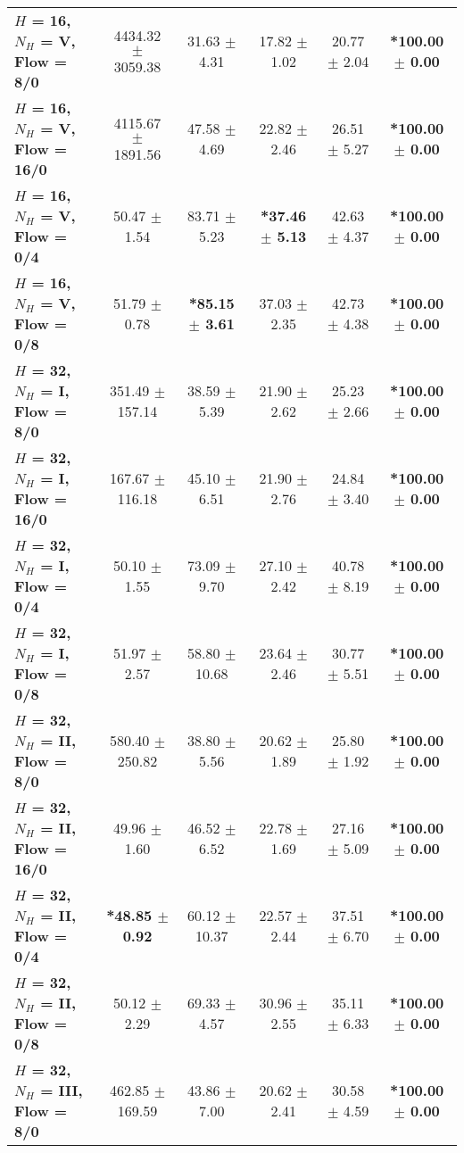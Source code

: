 \begin{table*}[ht]
{\begin{tabular}{lccccc}
        \midrule
        \textbf{$H$ = 16, $N_H$ = V, Flow = 8/0} & 4434.32 $\pm$ 3059.38 & 31.63 $\pm$ 4.31 & 17.82 $\pm$ 1.02 & 20.77 $\pm$ 2.04 & \textbf{*100.00 $\pm$ 0.00} \\
        \textbf{$H$ = 16, $N_H$ = V, Flow = 16/0} & 4115.67 $\pm$ 1891.56 & 47.58 $\pm$ 4.69 & 22.82 $\pm$ 2.46 & 26.51 $\pm$ 5.27 & \textbf{*100.00 $\pm$ 0.00} \\
        \textbf{$H$ = 16, $N_H$ = V, Flow = 0/4} & 50.47 $\pm$ 1.54 & 83.71 $\pm$ 5.23 & \textbf{*37.46 $\pm$ 5.13} & 42.63 $\pm$ 4.37 & \textbf{*100.00 $\pm$ 0.00} \\
        \textbf{$H$ = 16, $N_H$ = V, Flow = 0/8} & 51.79 $\pm$ 0.78 & \textbf{*85.15 $\pm$ 3.61} & 37.03 $\pm$ 2.35 & 42.73 $\pm$ 4.38 & \textbf{*100.00 $\pm$ 0.00} \\
        \midrule
        \midrule
        \textbf{$H$ = 32, $N_H$ = I, Flow = 8/0} & 351.49 $\pm$ 157.14 & 38.59 $\pm$ 5.39 & 21.90 $\pm$ 2.62 & 25.23 $\pm$ 2.66 & \textbf{*100.00 $\pm$ 0.00} \\
        \textbf{$H$ = 32, $N_H$ = I, Flow = 16/0} & 167.67 $\pm$ 116.18 & 45.10 $\pm$ 6.51 & 21.90 $\pm$ 2.76 & 24.84 $\pm$ 3.40 & \textbf{*100.00 $\pm$ 0.00} \\
        \textbf{$H$ = 32, $N_H$ = I, Flow = 0/4} & 50.10 $\pm$ 1.55 & 73.09 $\pm$ 9.70 & 27.10 $\pm$ 2.42 & 40.78 $\pm$ 8.19 & \textbf{*100.00 $\pm$ 0.00} \\
        \textbf{$H$ = 32, $N_H$ = I, Flow = 0/8} & 51.97 $\pm$ 2.57 & 58.80 $\pm$ 10.68 & 23.64 $\pm$ 2.46 & 30.77 $\pm$ 5.51 & \textbf{*100.00 $\pm$ 0.00} \\
        \midrule
        \textbf{$H$ = 32, $N_H$ = II, Flow = 8/0} & 580.40 $\pm$ 250.82 & 38.80 $\pm$ 5.56 & 20.62 $\pm$ 1.89 & 25.80 $\pm$ 1.92 & \textbf{*100.00 $\pm$ 0.00} \\
        \textbf{$H$ = 32, $N_H$ = II, Flow = 16/0} & 49.96 $\pm$ 1.60 & 46.52 $\pm$ 6.52 & 22.78 $\pm$ 1.69 & 27.16 $\pm$ 5.09 & \textbf{*100.00 $\pm$ 0.00} \\
        \textbf{$H$ = 32, $N_H$ = II, Flow = 0/4} & \textbf{*48.85 $\pm$ 0.92} & 60.12 $\pm$ 10.37 & 22.57 $\pm$ 2.44 & 37.51 $\pm$ 6.70 & \textbf{*100.00 $\pm$ 0.00} \\
        \textbf{$H$ = 32, $N_H$ = II, Flow = 0/8} & 50.12 $\pm$ 2.29 & 69.33 $\pm$ 4.57 & 30.96 $\pm$ 2.55 & 35.11 $\pm$ 6.33 & \textbf{*100.00 $\pm$ 0.00} \\
        \midrule
        \textbf{$H$ = 32, $N_H$ = III, Flow = 8/0} & 462.85 $\pm$ 169.59 & 43.86 $\pm$ 7.00 & 20.62 $\pm$ 2.41 & 30.58 $\pm$ 4.59 & \textbf{*100.00 $\pm$ 0.00} \\

\end{tabular}}
\end{table*}
